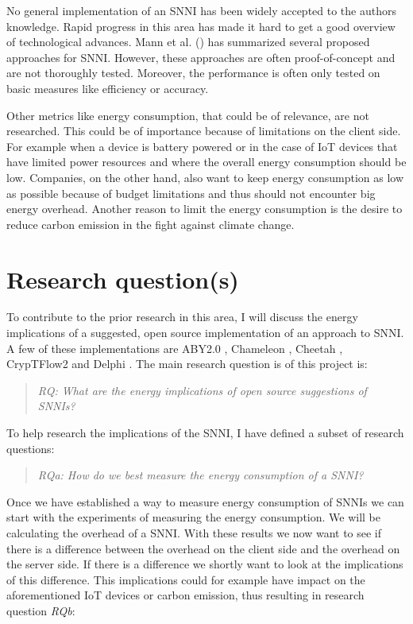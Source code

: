 \documentclass[../thesis.tex]{subfiles}
\begin{document}
No general implementation of an SNNI has been widely accepted to the authors knowledge. Rapid progress in this area has made it hard to get a good overview of technological advances. Mann et al. (\citeyear{Mann22}) has summarized several proposed approaches for SNNI. However, these approaches are often proof-of-concept and are not thoroughly tested. Moreover, the performance is often only tested on basic measures like efficiency or accuracy.

Other metrics like energy consumption, that could be of relevance, are not researched. This could be of importance because of limitations on the client side. For example when a device is battery powered or in the case of IoT devices that have limited power resources and where the overall energy consumption should be low. Companies, on the other hand, also want to keep energy consumption as low as possible because of budget limitations and thus should not encounter big energy overhead. Another reason to limit the energy consumption is the desire to reduce carbon emission in the fight against climate change.

\section{Research question(s)}
To contribute to the prior research in this area, I will discuss the energy implications of a suggested, open source implementation of an approach to SNNI. A few of these implementations are ABY2.0 \parencite{ABY20}, Chameleon \parencite{Chameleon}, Cheetah \parencite{Cheetah}, CrypTFlow2 \parencite{CrypTFlow2} and Delphi \parencite{Delphi}. The main research question is of this project is:

\begin{quote} \emph{RQ: What are the energy implications of open source suggestions of SNNIs?} \end{quote} 

\noindent To help research the implications of the SNNI, I have defined a subset of research questions:

\begin{quote} \emph{RQa: How do we best measure the energy consumption of a SNNI?} \end{quote}

\noindent Once we have established a way to measure energy consumption of SNNIs we can start with the experiments of measuring the energy consumption. We will be calculating the overhead of a SNNI. With these results we now want to see if there is a difference between the overhead on the client side and the overhead on the server side. If there is a difference we shortly want to look at the implications of this difference. This implications could for example have impact on the aforementioned IoT devices or carbon emission, thus resulting in research question \textit{RQb}:
\end{document}
